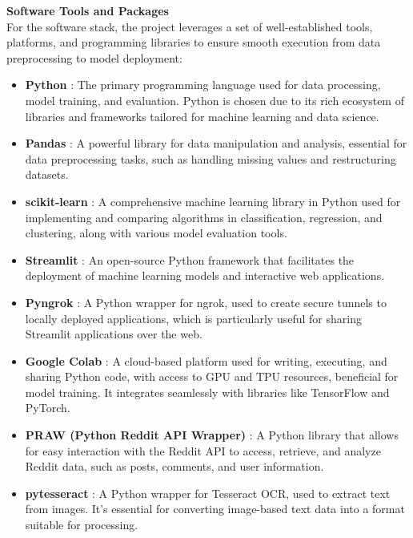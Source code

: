 \noindent
\textbf{Software Tools and Packages} \\
\noindent
For the software stack, the project leverages a set of well-established tools, platforms, and programming libraries to ensure smooth execution from data preprocessing to model deployment:
\begin{itemize}
    \item \textbf{Python} :
    \noindent
    The primary programming language used for data processing, model training, and evaluation. Python is chosen due to its rich ecosystem of libraries and frameworks tailored for machine learning and data science.
    
    \item \textbf{Pandas} :
    \noindent
    A powerful library for data manipulation and analysis, essential for data preprocessing tasks, such as handling missing values and restructuring datasets.
    
    \item \textbf{scikit-learn} :
    \noindent
    A comprehensive machine learning library in Python used for implementing and comparing algorithms in classification, regression, and clustering, along with various model evaluation tools.
    
    \item \textbf{Streamlit} :
    \noindent
    An open-source Python framework that facilitates the deployment of machine learning models and interactive web applications.
    
    \item \textbf{Pyngrok} :
    \noindent
    A Python wrapper for ngrok, used to create secure tunnels to locally deployed applications, which is particularly useful for sharing Streamlit applications over the web.
    
    \item \textbf{Google Colab} :
    \noindent
    A cloud-based platform used for writing, executing, and sharing Python code, with access to GPU and TPU resources, beneficial for model training. It integrates seamlessly with libraries like TensorFlow and PyTorch.
    
    \item \textbf{PRAW (Python Reddit API Wrapper)} :
    \noindent
    A Python library that allows for easy interaction with the Reddit API to access, retrieve, and analyze Reddit data, such as posts, comments, and user information.

    \item \textbf{pytesseract} :
    \noindent
    A Python wrapper for Tesseract OCR, used to extract text from images. It's essential for converting image-based text data into a format suitable for processing.
    

\end{itemize}
